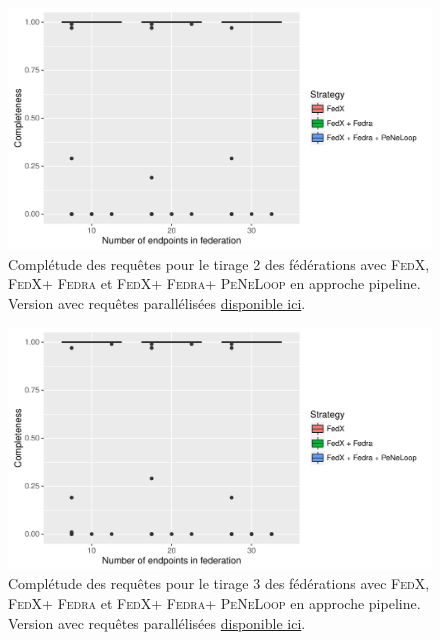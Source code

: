 \documentclass[a4paper]{article}
\def\fedra{\textsc{Fedra}\xspace}
\def\fedx{\textsc{FedX}\xspace}
\def\peneloop{\textsc{PeNeLoop}\xspace}
\newcommand{\parallelLink}[1]{Version avec requêtes parallélisées \href{#1}{disponible ici}.}
\begin{document}
\begin{figure}[h]
    \centering
    \includegraphics{boxplots/fed2_completeness.pdf}
    \caption{Complétude des requêtes pour le tirage 2 des fédérations avec \fedx, \fedx + \fedra et \fedx + \fedra + \peneloop en approche pipeline. \parallelLink{https://github.com/Callidon/ParallelNestedLoop/blob/master/results/definitive/fed2_pll_completeness.pdf}}
    \label{fig:fed2_compl}
\end{figure}

\begin{figure}[h]
    \centering
    \includegraphics{boxplots/fed3_completeness.pdf}
    \caption{Complétude des requêtes pour le tirage 3 des fédérations avec \fedx, \fedx + \fedra et \fedx + \fedra + \peneloop en approche pipeline. \parallelLink{https://github.com/Callidon/ParallelNestedLoop/blob/master/results/definitive/fed3_pll_completeness.pdf}}
    \label{fig:fed3_compl}
\end{figure}
\end{document}

